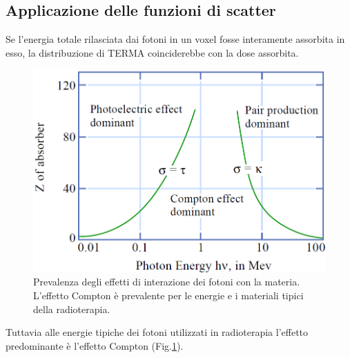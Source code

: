 {\subsection{Applicazione delle funzioni di scatter}
Se l'energia totale rilasciata dai fotoni in un voxel fosse interamente assorbita in esso, la distribuzione di TERMA coinciderebbe con la dose assorbita.\\
\begin{figure}
\centering
\includegraphics[width=.7\textwidth]{./cap1/compt_dom.png}
\caption{Prevalenza degli effetti di interazione dei fotoni con la materia. L'effetto Compton è prevalente per le energie e i materiali tipici della radioterapia.}
\label{fig:compt_dom}
\end{figure}
Tuttavia alle energie tipiche dei fotoni utilizzati in radioterapia l'effetto predominante è l'effetto Compton (Fig.\ref{fig:compt_dom}).

}

